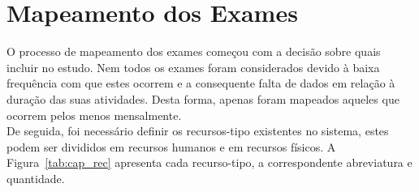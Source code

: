 
%


\epigraphfontsize{\small\itshape}
\setlength\epigraphwidth{12.5cm}
\setlength\epigraphrule{0pt}

\chapter{Mapeamento dos Exames}
\label{cha:mapeamento_dos_exames}


O processo de mapeamento dos exames começou com a decisão sobre quais incluir no estudo. Nem todos os exames foram considerados devido à baixa frequência com que estes ocorrem e a consequente falta de dados em relação à duração das suas atividades. Desta forma, apenas foram mapeados aqueles que ocorrem pelos menos mensalmente.\\
De seguida, foi necessário definir os recursos-tipo existentes no sistema, estes podem ser divididos em recursos humanos e em recursos físicos. A Figura~\ref{tab:cap_rec} apresenta cada recurso-tipo, a correspondente abreviatura e quantidade.

